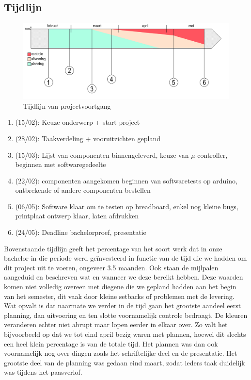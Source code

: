 \documentclass[a4paper,dutch]{article}
\begin{document}
\subsection{Tijdlijn}
\begin{figure}[H]
\centering
\includegraphics[width=\textwidth]{Timeline.png}
\caption{\label{fig:tijdlijn}Tijdlijn van projectvoortgang}
\end{figure}

\begin{enumerate}
\item (15/02): Keuze onderwerp + start project
\item (28/02): Taakverdeling + vooruitzichten gepland
\item (15/03): Lijst van componenten binnengeleverd, keuze van $\mu$-controller, beginnen met softwaregedeelte
\item (22/02): componenten aangekomen beginnen van softwaretests op arduino, ontbrekende of andere componenten bestellen
\item (06/05): Software klaar om te testen op breadboard, enkel nog kleine bugs, printplaat ontwerp klaar, laten afdrukken
\item (24/05): Deadline bachelorproef, presentatie
\end{enumerate}

Bovenstaande tijdlijn geeft het percentage van het soort werk dat in onze bachelor in die periode werd geïnvesteerd in functie van de tijd die we hadden om dit project uit te voeren, ongeveer 3.5 maanden. Ook staan de mijlpalen aangeduid en beschreven wat en wanneer we deze bereikt hebben. Deze waarden komen niet volledig overeen met diegene die we gepland hadden aan het begin van het semester, dit vaak door kleine setbacks of problemen met de levering. Wat opvalt is dat naarmate we verder in de tijd gaan het grootste aandeel eerst planning, dan uitvoering en ten slotte voornamelijk controle bedraagt. De kleuren veranderen echter niet abrupt maar lopen eerder in elkaar over. Zo valt het bijvoorbeeld op dat we tot eind april bezig waren met plannen, hoewel dit slechts een heel klein percentage is van de totale tijd. Het plannen was dan ook voornamelijk nog over dingen zoals het schriftelijke deel en de presentatie. Het grootste deel van de planning was gedaan eind maart, zodat ieders taak duidelijk was tijdens het paasverlof.
\end{document}
